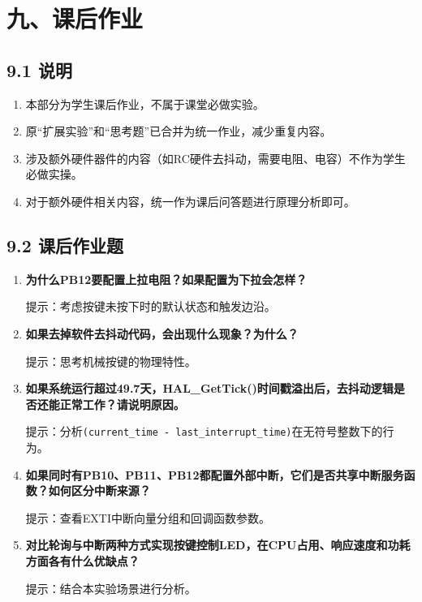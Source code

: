 \documentclass[
  chinese,
  UTF8,
  oneside,
  openany]{ctexbook}
\providecommand{\tightlist}{%
  \setlength{\itemsep}{0pt}\setlength{\parskip}{0pt}}
\begin{document}
\section{九、课后作业}\label{ux4e5dux8bfeux540eux4f5cux4e1a}

\subsection{9.1 说明}\label{ux8bf4ux660e}

\begin{enumerate}
\def\labelenumi{\arabic{enumi}.}
\tightlist
\item
  本部分为学生课后作业，不属于课堂必做实验。
\item
  原``扩展实验''和``思考题''已合并为统一作业，减少重复内容。
\item
  涉及额外硬件器件的内容（如RC硬件去抖动，需要电阻、电容）不作为学生必做实操。
\item
  对于额外硬件相关内容，统一作为课后问答题进行原理分析即可。
\end{enumerate}

\subsection{9.2 课后作业题}\label{ux8bfeux540eux4f5cux4e1aux9898}

\begin{enumerate}
\def\labelenumi{\arabic{enumi}.}
\item
  \textbf{为什么PB12要配置上拉电阻？如果配置为下拉会怎样？}

  提示：考虑按键未按下时的默认状态和触发边沿。
\item
  \textbf{如果去掉软件去抖动代码，会出现什么现象？为什么？}

  提示：思考机械按键的物理特性。
\item
  \textbf{如果系统运行超过49.7天，HAL\_GetTick()时间戳溢出后，去抖动逻辑是否还能正常工作？请说明原因。}

  提示：分析\texttt{(current\_time\ -\ last\_interrupt\_time)}在无符号整数下的行为。
\item
  \textbf{如果同时有PB10、PB11、PB12都配置外部中断，它们是否共享中断服务函数？如何区分中断来源？}

  提示：查看EXTI中断向量分组和回调函数参数。
\item
  \textbf{对比轮询与中断两种方式实现按键控制LED，在CPU占用、响应速度和功耗方面各有什么优缺点？}

  提示：结合本实验场景进行分析。
\end{enumerate}
\end{document}
